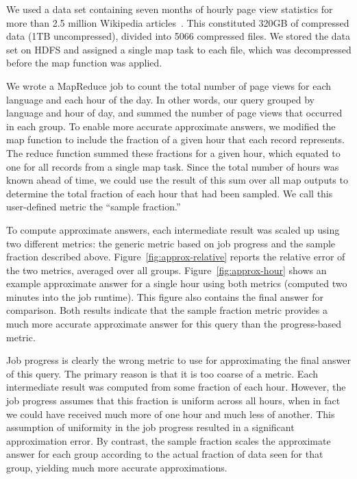 We used a data set containing seven months of hourly page view statistics for
more than 2.5 million Wikipedia articles~\cite{wikistats}. This constituted
320GB of compressed data (1TB uncompressed), divided into 5066 compressed
files. We stored the data set on HDFS and assigned a single map task to each
file, which was decompressed before the map function was applied.

We wrote a MapReduce job to count the total number of page views for each
language and each hour of the day. In other words, our query grouped by language
and hour of day, and summed the number of page views that occurred in each
group. To enable more accurate approximate answers, we modified the map function
to include the fraction of a given hour that each record represents. The reduce
function summed these fractions for a given hour, which equated to one for all
records from a single map task. Since the total number of hours was known ahead
of time, we could use the result of this sum over all map outputs to determine
the total fraction of each hour that had been sampled. We call this user-defined
metric the ``sample fraction.''

To compute approximate answers, each intermediate result was scaled up using two
different metrics: the generic metric based on job progress and the sample
fraction described above. Figure~\ref{fig:approx-relative} reports the relative
error of the two metrics, averaged over all groups. Figure~\ref{fig:approx-hour}
shows an example approximate answer for a single hour using both metrics
(computed two minutes into the job runtime). This figure also contains the final
answer for comparison. Both results indicate that the sample fraction metric provides a
much more accurate approximate answer for this query than the progress-based
metric.

Job progress is clearly the wrong metric to use for approximating the final
answer of this query. The primary reason is that it is too coarse of a
metric. Each intermediate result was computed from some fraction of each
hour. However, the job progress assumes that this fraction is uniform across all
hours, when in fact we could have received much more of one hour and much less
of another. This assumption of uniformity in the job progress resulted in a
significant approximation error. By contrast, the sample fraction scales the
approximate answer for each group according to the actual fraction of data seen for
that group, yielding much more accurate approximations.
